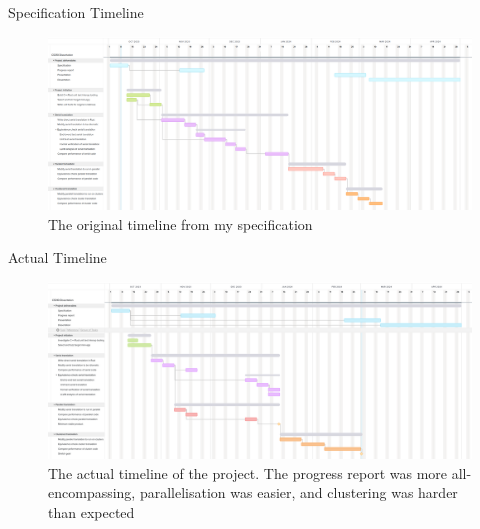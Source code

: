 \documentclass[10pt,aspectratio=169]{beamer}
\begin{document}
\begin{frame}{Specification Timeline}
    \begin{figure}[h]
        \centering
        \includegraphics[width=\textwidth]{images/specification_gantt_chart.png}
        \caption{The original timeline from my specification}
        \label{fig:specification_gantt_chart}
    \end{figure}
\end{frame}

\begin{frame}{Actual Timeline}
    \begin{figure}[h]
        \centering
        \includegraphics[width=\textwidth]{images/actual_gantt_chart.png}
        \caption{The actual timeline of the project. The progress report was more all-encompassing, parallelisation was easier, and clustering was harder than expected}
        \label{fig:actual_gantt_chart}
    \end{figure}
\end{frame}

\end{document}
